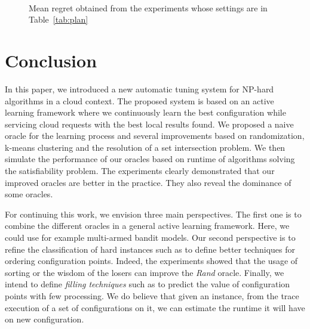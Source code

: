 \documentclass[10pt, conference, compsocconf]{IEEEtran}
\begin{document}
\begin{figure}[ht]
{}
\\

\caption{Mean regret obtained from the experiments whose settings are in Table~\ref{tab:plan}}
\label{fig:regret}
\end{figure}

\section{Conclusion} \label{Conclusion}

In this paper, we introduced a new automatic tuning system for NP-hard algorithms in a cloud
context. The proposed system is based on an active learning framework where we continuously
learn the best configuration while servicing cloud requests with the best local results found.
We proposed a naive oracle for the learning process and several
 improvements based on randomization, k-means clustering and the resolution of a set intersection problem.
We then simulate the performance of our oracles based on runtime of algorithms solving the satisfiability
problem. The experiments clearly demonstrated that our improved oracles are better in the practice.
They also reveal the dominance of some oracles.

For continuing this work, we envision three main perspectives. The first one is to combine the different
oracles in a general active learning framework. Here, we could
use for example multi-armed bandit models. Our second perspective is to refine the classification of hard
instances such as to define better techniques for ordering configuration points. Indeed, the experiments showed
that the usage of sorting or the wisdom of the losers can improve the {\it Rand} oracle. Finally, we intend
to define {\it filling techniques} such as to predict the value of configuration points with few processing.
We do believe that given an instance, from the trace execution of a set of configurations on it,  we can estimate the runtime
it will have on new configuration.







\end{document}
